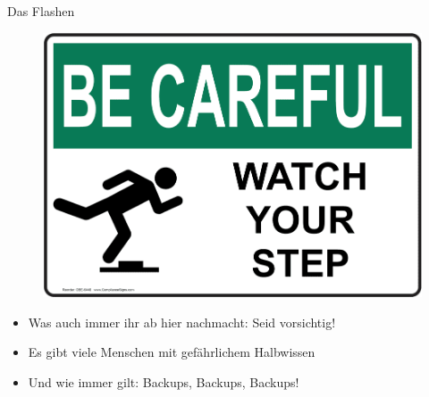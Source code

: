 \begin{frame}{Das Flashen}
	\begin{figure}
		\includegraphics[scale=0.2]{resources/OSHA-Watch-Your-Step-Sign-OBE-6440_1000.jpg}
	\end{figure}
	\begin{itemize}[<+->]
		\item Was auch immer ihr ab hier nachmacht: Seid vorsichtig!
		\item Es gibt viele Menschen mit gefährlichem Halbwissen 
		\item Und wie immer gilt: Backups, Backups, Backups!
	\end{itemize}
\end{frame}